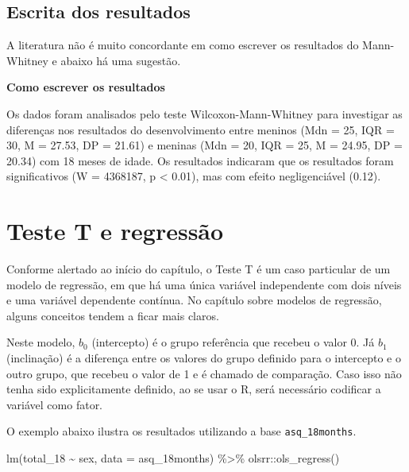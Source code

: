 \documentclass[
]{book}
\newenvironment{Shaded}{\begin{snugshade}}{\end{snugshade}}
\newcommand{\AttributeTok}[1]{\textcolor[rgb]{0.77,0.63,0.00}{#1}}
\newcommand{\FunctionTok}[1]{\textcolor[rgb]{0.00,0.00,0.00}{#1}}
\newcommand{\NormalTok}[1]{#1}
\newcommand{\SpecialCharTok}[1]{\textcolor[rgb]{0.00,0.00,0.00}{#1}}
\begin{document}
\hypertarget{escrita-dos-resultados-3}{%
\subsection{Escrita dos resultados}\label{escrita-dos-resultados-3}}

A literatura não é muito concordante em como escrever os resultados do Mann-Whitney e abaixo há uma sugestão.

\textbf{Como escrever os resultados}

Os dados foram analisados pelo teste Wilcoxon-Mann-Whitney para investigar as diferenças nos resultados do desenvolvimento entre meninos (Mdn = 25, IQR = 30, M = 27.53, DP = 21.61) e meninas (Mdn = 20, IQR = 25, M = 24.95, DP = 20.34) com 18 meses de idade. Os resultados indicaram que os resultados foram significativos (W = 4368187, p \textless{} 0.01), mas com efeito negligenciável (0.12).

\hypertarget{teste-t-e-regressuxe3o}{%
\section{Teste T e regressão}\label{teste-t-e-regressuxe3o}}

Conforme alertado ao início do capítulo, o Teste T é um caso particular de um modelo de regressão, em que há uma única variável independente com dois níveis e uma variável dependente contínua. No capítulo sobre modelos de regressão, alguns conceitos tendem a ficar mais claros.

Neste modelo, \(b_0\) (intercepto) é o grupo referência que recebeu o valor 0. Já \(b_1\) (inclinação) é a diferença entre os valores do grupo definido para o intercepto e o outro grupo, que recebeu o valor de 1 e é chamado de comparação. Caso isso não tenha sido explicitamente definido, ao se usar o R, será necessário codificar a variável como fator.

O exemplo abaixo ilustra os resultados utilizando a base \texttt{asq\_18months}.

\begin{Shaded}
\begin{Highlighting}[]
\FunctionTok{lm}\NormalTok{(total\_18 }\SpecialCharTok{\textasciitilde{}}\NormalTok{ sex, }\AttributeTok{data =}\NormalTok{ asq\_18months) }\SpecialCharTok{\%\textgreater{}\%}
\NormalTok{  olsrr}\SpecialCharTok{::}\FunctionTok{ols\_regress}\NormalTok{()}
\end{Highlighting}
\end{Shaded}
\end{document}
